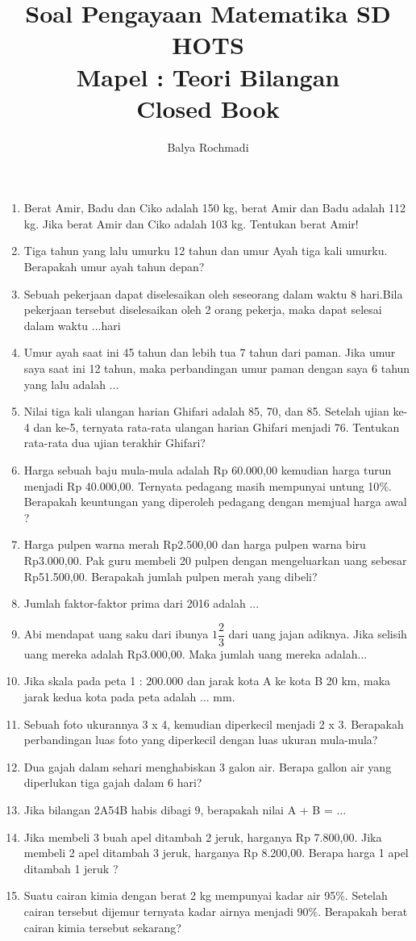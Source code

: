 \documentclass[12pt,a4paper,draft,final,oneside,twoside,openright,openany]{article}
\author{Balya Rochmadi}
\title{Soal Pengayaan Matematika SD HOTS \\Mapel : Teori Bilangan \\Closed Book}
\begin{document}
	\maketitle
	\Large
			\noindent\makebox[\linewidth]{\rule{\paperwidth}{0.4pt}}
	\begin{enumerate}
		\item Berat Amir, Badu dan Ciko adalah 150 kg, berat Amir dan Badu adalah 112 kg. Jika berat Amir dan Ciko adalah 103 kg. Tentukan berat Amir!
		\item Tiga tahun yang lalu umurku 12 tahun dan umur Ayah tiga kali umurku. Berapakah umur ayah tahun depan?
		\item Sebuah pekerjaan dapat diselesaikan oleh seseorang dalam waktu 8 hari.Bila pekerjaan tersebut diselesaikan oleh 2 orang pekerja, maka dapat selesai dalam waktu ...hari
		\item Umur ayah saat ini 45 tahun dan lebih tua 7 tahun dari paman. Jika umur saya saat ini 12 tahun, maka perbandingan umur paman dengan saya 6 tahun yang lalu adalah ...
		\item Nilai tiga kali ulangan harian Ghifari adalah 85, 70, dan 85. Setelah ujian ke-4 dan ke-5, ternyata rata-rata ulangan harian Ghifari menjadi 76. Tentukan rata-rata dua ujian terakhir Ghifari?
		\item  Harga sebuah baju mula-mula adalah Rp 60.000,00 kemudian harga turun menjadi Rp 40.000,00. Ternyata pedagang masih mempunyai untung 10$\%$. Berapakah keuntungan yang diperoleh pedagang dengan memjual harga awal ?
		\item Harga pulpen warna merah Rp2.500,00 dan harga pulpen warna biru Rp3.000,00. Pak guru membeli 20 pulpen dengan mengeluarkan uang sebesar Rp51.500,00. Berapakah jumlah pulpen merah yang dibeli?
		\item Jumlah faktor-faktor prima dari 2016 adalah ...
		\item Abi  mendapat  uang  saku  dari  ibunya  $1\dfrac{2}{3}$	dari uang  jajan  adiknya.  Jika  selisih  uang  mereka  adalah Rp3.000,00. Maka jumlah uang mereka adalah...
		\item Jika skala pada peta 1 : 200.000 dan jarak kota A ke kota B 20 km, maka jarak kedua kota pada peta adalah ... mm.
		\item Sebuah foto ukurannya 3 x 4, kemudian diperkecil menjadi 2 x 3. Berapakah perbandingan luas foto yang diperkecil dengan luas ukuran mula-mula?
		\item Dua gajah dalam sehari menghabiskan 3 galon air. Berapa gallon air yang diperlukan tiga gajah dalam	6 hari?
		\item Jika bilangan 2A54B habis dibagi 9, berapakah nilai A + B = ...
		\item Jika membeli 3 buah apel ditambah 2 jeruk, harganya Rp 7.800,00. Jika membeli 2 apel ditambah 3 jeruk, harganya Rp 8.200,00. Berapa harga 1 apel ditambah 1 jeruk ?
		\item Suatu cairan kimia dengan berat 2 kg mempunyai kadar air 95$\%$. Setelah cairan tersebut dijemur ternyata kadar airnya menjadi 90$\%$. Berapakah berat cairan kimia tersebut sekarang?
	\end{enumerate}
\end{document}
